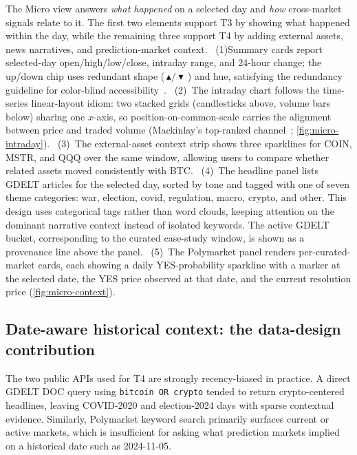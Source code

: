 \documentclass[journal,hideappendix]{vgtc}      %
\begin{document}
The Micro view answers \emph{what happened} on a selected day and \emph{how} cross-market signals relate to it.  The first two elements support T3 by showing what happened within the day, while the remaining three support T4 by adding external assets, news narratives, and prediction-market context.
~(1)Summary cards report selected-day open/high/low/close, intraday range, and 24-hour change; the up/down chip uses redundant shape (\,$\blacktriangle/\blacktriangledown$\,) and hue, satisfying the redundancy guideline for color-blind accessibility~\cite{wong2011points}.
~(2)~The intraday chart follows the time-series linear-layout idiom: two stacked grids (candlesticks above, volume bars below) sharing one $x$-axis, so position-on-common-scale carries the alignment between price and traded volume (Mackinlay's top-ranked channel~\cite{mackinlay1986}; \cref{fig:micro-intraday}).
~(3)~The external-asset context strip shows three sparklines for COIN, MSTR, and QQQ over the same window, allowing users to compare whether related assets moved consistently with BTC. 
~(4)~The headline panel lists GDELT articles for the selected day, sorted by tone and tagged with one of seven theme categories: war, election, covid, regulation, macro, crypto, and other. This design uses categorical tags rather than word clouds, keeping attention on the dominant narrative context instead of isolated keywords. The active GDELT bucket, corresponding to the curated case-study window, is shown as a provenance line above the panel. 
~(5)~The Polymarket panel renders per-curated-market cards, each showing a daily YES-probability sparkline with a marker at the
selected date, the YES price observed at that date, and the current
resolution price (\cref{fig:micro-context}).


\subsection{Date-aware historical context: the data-design contribution}
\label{sec:curated}

The two public APIs used for T4 are strongly recency-biased in practice. 
A direct GDELT DOC query using \texttt{bitcoin OR crypto} tended to return crypto-centered headlines, leaving COVID-2020 and election-2024 days with sparse contextual evidence. 
Similarly, Polymarket keyword search primarily surfaces current or active markets, which is insufficient for asking what prediction markets implied on a historical date such as 2024-11-05.
\end{document}
